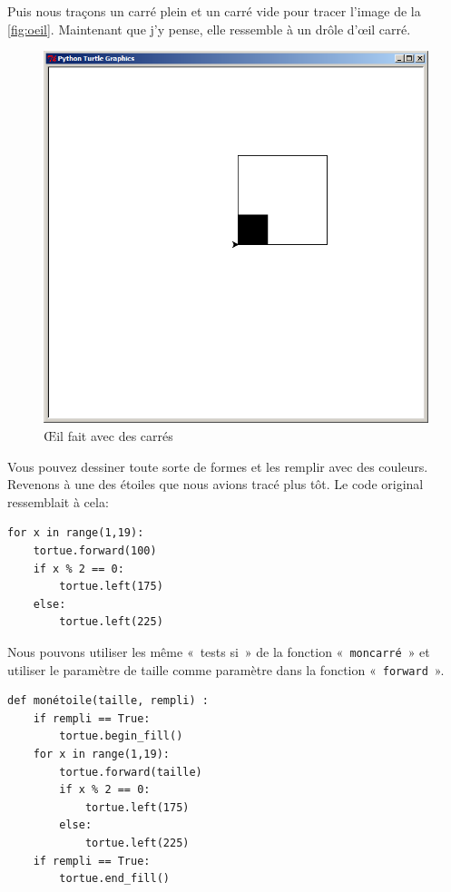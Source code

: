 Puis nous traçons un carré plein et un carré vide pour tracer l'image de la \autoref{fig:oeil}. Maintenant que j'y pense, elle ressemble à un drôle d'œil carré.

\begin{figure}[h!]
\centering
\includegraphics[scale=0.4]{images/oeil}
\caption{Œil fait avec des carrés}\label{fig:oeil}
\end{figure}

Vous pouvez dessiner toute sorte de formes et les remplir avec des couleurs. Revenons à une des étoiles que nous avions tracé plus tôt. Le code original ressemblait à cela:
\begin{Verbatim}[frame=single,rulecolor=\color{gray}, label=ne pas saisir]
for x in range(1,19):
    tortue.forward(100)
    if x % 2 == 0:
        tortue.left(175)
    else:
        tortue.left(225)
\end{Verbatim}

Nous pouvons utiliser les même «~tests si~»  de la fonction «~\texttt{moncarré}~» et utiliser le paramètre de taille comme paramètre dans la fonction «~\texttt{forward}~».

\begin{Verbatim}[frame=single,rulecolor=\color{mbleu}, label=à taper]
def monétoile(taille, rempli) :
    if rempli == True:
        tortue.begin_fill()
    for x in range(1,19):
        tortue.forward(taille)
        if x % 2 == 0:
            tortue.left(175)
        else:
            tortue.left(225)
    if rempli == True:
        tortue.end_fill()
\end{Verbatim}

